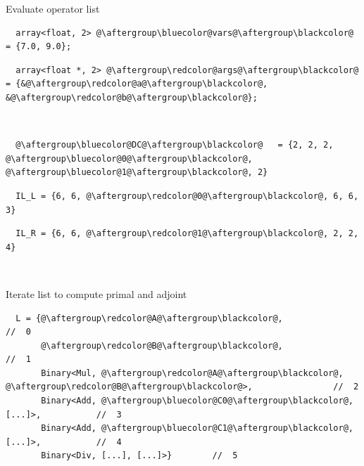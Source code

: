 \documentclass[xcolor=dvipsnames]{beamer}
\begin{document}
\begin{frame}[fragile]{Evaluate operator list}
\begin{lstlisting}
  array<float, 2> @\aftergroup\bluecolor@vars@\aftergroup\blackcolor@   = {7.0, 9.0};
\end{lstlisting}
\begin{lstlisting}
  array<float *, 2> @\aftergroup\redcolor@args@\aftergroup\blackcolor@ = {&@\aftergroup\redcolor@a@\aftergroup\blackcolor@, &@\aftergroup\redcolor@b@\aftergroup\blackcolor@};
\end{lstlisting}

~

\begin{lstlisting}
  @\aftergroup\bluecolor@DC@\aftergroup\blackcolor@   = {2, 2, 2, @\aftergroup\bluecolor@0@\aftergroup\blackcolor@, @\aftergroup\bluecolor@1@\aftergroup\blackcolor@, 2}
\end{lstlisting}
\begin{lstlisting}
  IL_L = {6, 6, @\aftergroup\redcolor@0@\aftergroup\blackcolor@, 6, 6, 3}
\end{lstlisting}
\begin{lstlisting}
  IL_R = {6, 6, @\aftergroup\redcolor@1@\aftergroup\blackcolor@, 2, 2, 4}
\end{lstlisting}

~

Iterate list to compute primal and adjoint
\begin{lstlisting}
  L = {@\aftergroup\redcolor@A@\aftergroup\blackcolor@,                                //  0
       @\aftergroup\redcolor@B@\aftergroup\blackcolor@,                                //  1
       Binary<Mul, @\aftergroup\redcolor@A@\aftergroup\blackcolor@, @\aftergroup\redcolor@B@\aftergroup\blackcolor@>,                //  2
       Binary<Add, @\aftergroup\bluecolor@C0@\aftergroup\blackcolor@, [...]>,           //  3
       Binary<Add, @\aftergroup\bluecolor@C1@\aftergroup\blackcolor@, [...]>,           //  4
       Binary<Div, [...], [...]>}        //  5
\end{lstlisting}
\end{frame}
\end{document}

